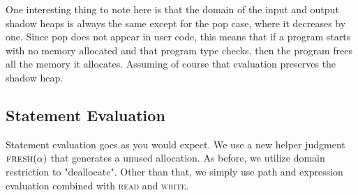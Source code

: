 One interesting thing to note here is that the domain of the input and output shadow heaps
is always the same except for the \textsf{pop} case, where it decreases by one.
Since \textsf{pop} does not appear in user code, this means that if a program starts
with no memory allocated and that program type checks, then the program frees all the
memory it allocates. Assuming of course that evaluation preserves the shadow heap.

\subsection*{Statement Evaluation}
Statement evaluation goes as you would expect.
We use a new helper judgment $\textsc{fresh}(\alpha)$ that generates a unused allocation.
As before, we utilize domain restriction to "deallocate".
Other than that, we simply use path and expression evaluation combined
with \textsc{read} and \textsc{write}.
\newline


